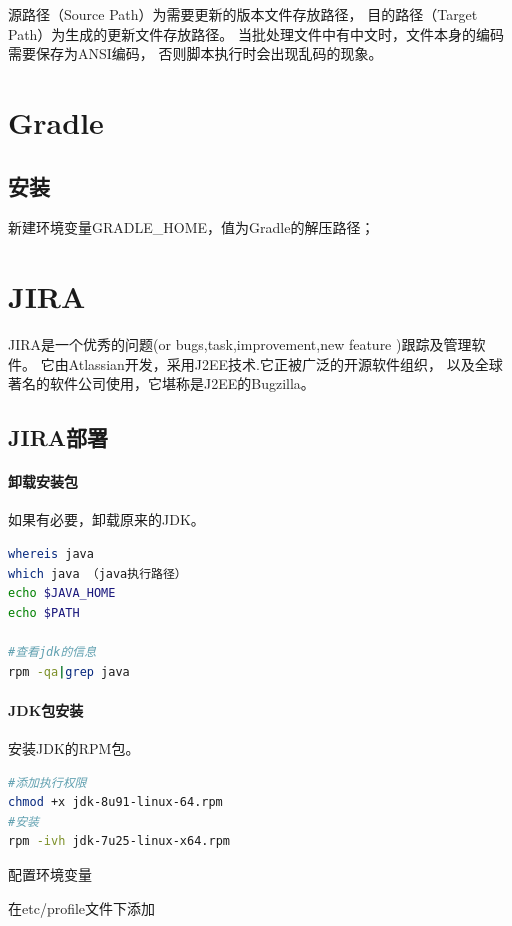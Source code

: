 \documentclass{book}
\begin{document}
源路径（Source Path）为需要更新的版本文件存放路径，
目的路径（Target Path）为生成的更新文件存放路径。
当批处理文件中有中文时，文件本身的编码需要保存为ANSI编码，
否则脚本执行时会出现乱码的现象。


\section{Gradle}

\subsection{安装}

新建环境变量GRADLE\_HOME，值为Gradle的解压路径；

\section{JIRA}

JIRA是一个优秀的问题(or bugs,task,improvement,new feature )跟踪及管理软件。
它由Atlassian开发，采用J2EE技术.它正被广泛的开源软件组织，
以及全球著名的软件公司使用，它堪称是J2EE的Bugzilla。

\subsection{JIRA部署}

\paragraph{卸载安装包}如果有必要，卸载原来的JDK。

\begin{lstlisting}[language=Bash]
whereis java
which java （java执行路径）
echo $JAVA_HOME
echo $PATH

#查看jdk的信息
rpm -qa|grep java
\end{lstlisting}

\paragraph{JDK包安装}安装JDK的RPM包。

\begin{lstlisting}[language=Bash]
#添加执行权限
chmod +x jdk-8u91-linux-64.rpm
#安装
rpm -ivh jdk-7u25-linux-x64.rpm
\end{lstlisting}

配置环境变量

在etc/profile文件下添加
\end{document}
